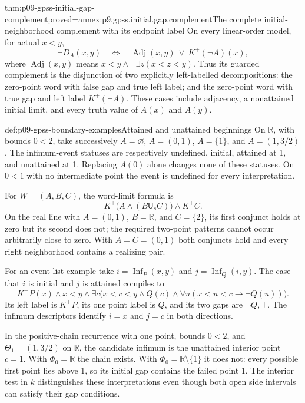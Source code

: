 \begin{hblemma}{thm:p09-gpss-initial-gap-complement}{proved=annex:p9.gpss.initial.gap.complement}{The complete initial-neighborhood complement with its endpoint label}
On every linear-order model, for actual \(x<y\),
\[
 \neg D_A(x,y)\quad\Longleftrightarrow\quad
       \operatorname{Adj}(x,y)\ \lor\ K^+(\neg A)(x),
\]
where \(\operatorname{Adj}(x,y)\) means
\(x<y\land\neg\exists z(x<z<y)\).
Thus its guarded complement is the disjunction of two explicitly
left-labelled decompositions: the zero-point word with false gap and
true left label; and the zero-point word with true gap and left label
\(K^+(\neg A)\). These cases include adjacency, a nonattained
initial limit, and every truth value of \(A(x)\) and \(A(y)\).
\end{hblemma}

\begin{hbexample}{def:p09-gpss-boundary-examples}{Attained and unattained beginnings}
On \(\mathbb R\), with bounds \(0<2\), take successively
\(A=\varnothing\), \(A=(0,1)\), \(A=\{1\}\), and
\(A=(1,3/2)\). The infimum-event statuses are respectively
undefined, initial, attained at 1, and unattained at 1. Replacing
\(A(0)\) alone changes none of these statuses. On \(0<1\) with
no intermediate point the event is undefined for every interpretation.

For \(W=(A,B,C)\), the word-limit formula is
\[
       K^+\bigl(A\land(B\mathbin{\mathsf U_s}C)\bigr)
                                      \land K^+C.
\]
On the real line with \(A=(0,1)\), \(B=\mathbb R\), and
\(C=\{2\}\), its first conjunct holds at zero but its second
does not; the required two-point patterns cannot occur arbitrarily
close to zero. With \(A=C=(0,1)\) both conjuncts hold and every
right neighborhood contains a realizing pair.

For an event-list example take
\(i=\operatorname{Inf}_P(x,y)\) and
\(j=\operatorname{Inf}_Q(i,y)\).
The case that \(i\) is initial and \(j\) is attained compiles to
\[
 K^+P(x)\land x<y\land
 \exists c\bigl(x<c<y\land Q(c)\land
                   \forall u(x<u<c\to\neg Q(u))\bigr).
\]
Its left label is \(K^+P\), its one point label is \(Q\),
and its two gaps are \(\neg Q,\top\). The infimum descriptors
identify \(i=x\) and \(j=c\) in both directions.

In the positive-chain recurrence with one point, bounds \(0<2\),
and \(\Theta_1=(1,3/2)\) on \(\mathbb R\), the candidate
infimum is the unattained interior point \(c=1\). With
\(\Phi_0=\mathbb R\) the chain exists. With
\(\Phi_0=\mathbb R\setminus\{1\}\) it does not: every
possible first point lies above 1, so its initial gap contains
the failed point 1. The interior test in \(k\) distinguishes
these interpretations even though both open side intervals
can satisfy their gap conditions.
\end{hbexample}

